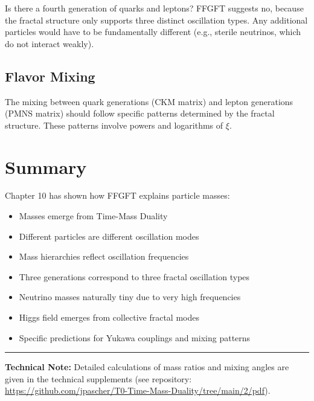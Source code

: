 Is there a fourth generation of quarks and leptons? FFGFT suggests no, because the fractal structure only supports three distinct oscillation types. Any additional particles would have to be fundamentally different (e.g., sterile neutrinos, which do not interact weakly).

\subsection{Flavor Mixing}

The mixing between quark generations (CKM matrix) and lepton generations (PMNS matrix) should follow specific patterns determined by the fractal structure. These patterns involve powers and logarithms of $\xi$.

\section{Summary}

Chapter 10 has shown how FFGFT explains particle masses:

\begin{itemize}[leftmargin=*]
\item Masses emerge from Time-Mass Duality
\item Different particles are different oscillation modes
\item Mass hierarchies reflect oscillation frequencies
\item Three generations correspond to three fractal oscillation types
\item Neutrino masses naturally tiny due to very high frequencies
\item Higgs field emerges from collective fractal modes
\item Specific predictions for Yukawa couplings and mixing patterns
\end{itemize}

\vspace{1cm}
\hrule
\vspace{0.5cm}
\noindent\textbf{Technical Note:} Detailed calculations of mass ratios and mixing angles are given in the technical supplements (see repository: \url{https://github.com/jpascher/T0-Time-Mass-Duality/tree/main/2/pdf}).




